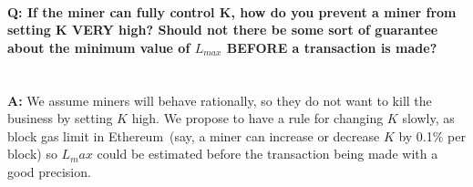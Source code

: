 \documentclass[]{llncs}   %
\begin{document}
\paragraph{\textbf{Q: } If the miner can fully control K, how do you prevent a miner from setting K VERY high? Should not there be some sort of guarantee about the minimum value of $L_{max}$ BEFORE a transaction is made?}~\\
\textbf{A: } We assume miners will behave rationally, so they do not want to kill the business by setting $K$ high. We propose to have a rule for changing $K$ slowly, as block gas limit in Ethereum~(say, a miner can increase or decrease $K$ by 0.1\% per block) so $L_max$ could be estimated before the transaction being made with a good precision.
\end{document}
